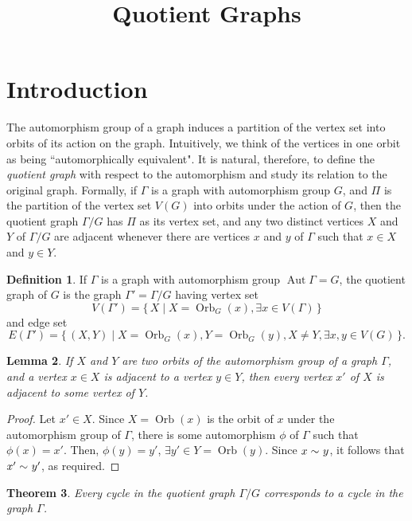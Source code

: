 \documentclass[12pt,a4paper]{amsart}
\title{Quotient Graphs}
\date{}
\newtheorem{Theorem}{Theorem}[section]
\newtheorem{Lemma}[Theorem]{Lemma}
\theoremstyle{remark}
\theoremstyle{definition}
\newtheorem{Definition}[Theorem]{Definition}
\newcommand{\adj}[1]{\sim_{\scriptscriptstyle #1}}
\DeclareMathOperator{\aut}{Aut}
\DeclareMathOperator{\orb}{Orb}
\begin{document}
\maketitle

\section{Introduction}
\label{sec:Intro}

The automorphism group of a graph induces a partition of the vertex set into orbits of its action on the graph. Intuitively, we think of the vertices in one orbit as being ``automorphically equivalent". It is natural, therefore, to define the \emph{quotient graph} with respect to the automorphism and study its relation to the original graph. Formally, if $\Gamma$ is a graph with automorphism group $G$, and $\mathcal \Pi$ is the partition of the vertex set $V(G)$ into orbits under the action of $G$, then the quotient graph $\Gamma/G$ has $\Pi$ as its vertex set, and any two distinct vertices $X$ and $Y$ of $\Gamma/G$ are adjacent whenever there are vertices $x$ and $y$ of $\Gamma$ such that $x \in X$ and $y \in Y$.

\begin{Definition}
If $\Gamma$ is a graph with automorphism group $\aut \Gamma = G$, the quotient graph of $G$ is the graph $\Gamma' = \Gamma/G$ having vertex set
\begin{equation*}
V(\Gamma') = \{\, X \mid X = \orb_G(x), \exists x \in V(\Gamma) \,\}
\end{equation*}
and edge set 
\begin{equation*}
E(\Gamma') = \{\, (X,Y) \mid X = \orb_G(x), Y = \orb_G(y), X \ne Y, \exists x, y \in V(G) \,\}.
\end{equation*}
\end{Definition}

\begin{Lemma}
\label{lem:xy=>x'y'}
If $X$ and $Y$ are two orbits of the automorphism group of a graph $\Gamma$, and a vertex $x \in X$ is adjacent to a vertex $y \in Y$, then every vertex $x'$ of $X$ is adjacent to some vertex of $Y$.
\end{Lemma}

\begin{proof}
Let $x' \in X$. Since $X = \orb(x)$ is the orbit of $x$ under the automorphism group of $\Gamma$, there is some automorphism $\phi$ of $\Gamma$ such that $\phi(x) = x'$. Then, $\phi(y) = y'$, $\exists y' \in Y = \orb(y)$. Since $x \adj{} y$, it follows that $x' \adj{} y'$, as required.
\end{proof}

\begin{Theorem}
Every cycle in the quotient graph $\Gamma/G$ corresponds to a cycle in the graph $\Gamma$.
\end{Theorem}
\end{document}
